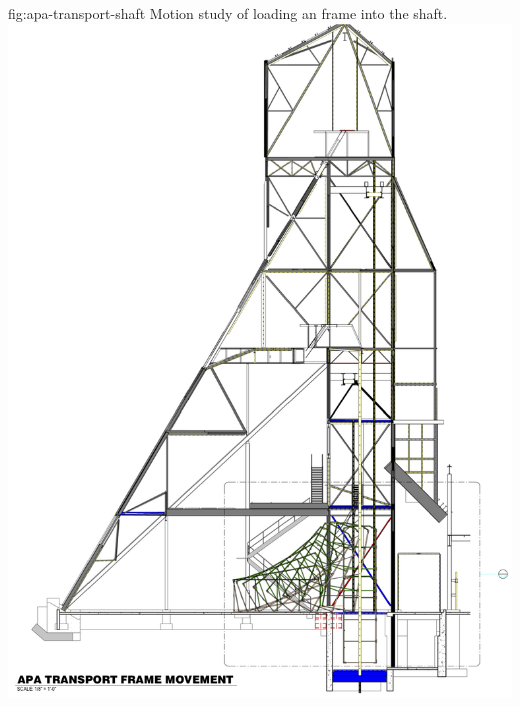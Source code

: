 \begin{dunefigure}{fig:apa-transport-shaft}
{Motion study of loading an  frame into the shaft.}  
\includegraphics[height=0.9\textheight,trim = 0mm 0mm 0mm 0mm, clip]{graphics/sp-apa-transport-shaft.png} 
\end{dunefigure}

